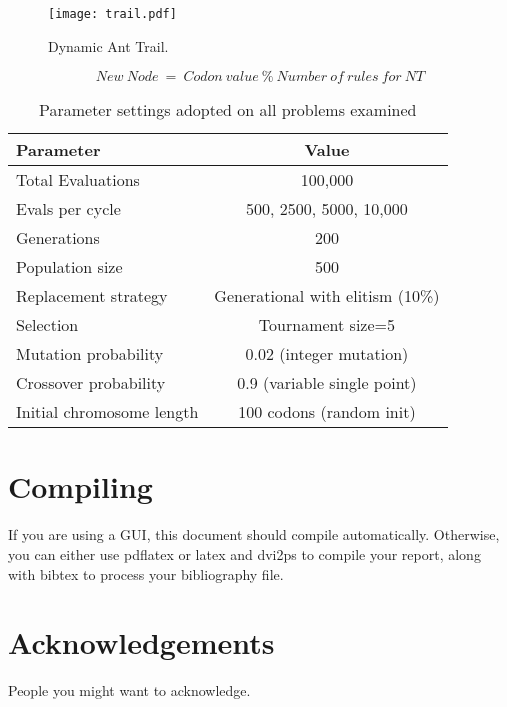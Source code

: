 \documentclass[twocolumn]{article}
\begin{document}
\begin{figure}
\centering
\texttt{[image: trail.pdf]}
\caption{Dynamic Ant Trail.}
\label{fig:trail}
\end{figure}

\begin{equation} New\ Node\ =\ Codon\ value\ \%\ Number\ of\ rules\ for\ NT
\label{eq1}
\end{equation}

\begin{table}
\caption{Parameter settings adopted on all problems examined} %
\centering      %
\begin{tabular}{l|c}  %
\hline                      %
{\bf Parameter}&{\bf Value}\\
\hline                    %
Total Evaluations & 100,000\\
Evals per cycle & 500, 2500, 5000, 10,000\\
Generations & 200\\
Population size & 500\\
Replacement strategy & Generational with elitism (10\%)\\
Selection & Tournament size=5\\
Mutation probability & 0.02 (integer mutation)\\
Crossover probability & 0.9 (variable single point)\\
Initial chromosome length & 100 codons (random init)\\
\hline     %
\end{tabular}
\label{table:params}
 \end{table}

\section{Compiling}

If you are using a GUI, this document should compile automatically. Otherwise,
you can either use pdflatex or latex and dvi2ps to compile your report, along
with bibtex to process your bibliography file.

\section{Acknowledgements}
People you might want to acknowledge.



\end{document}
